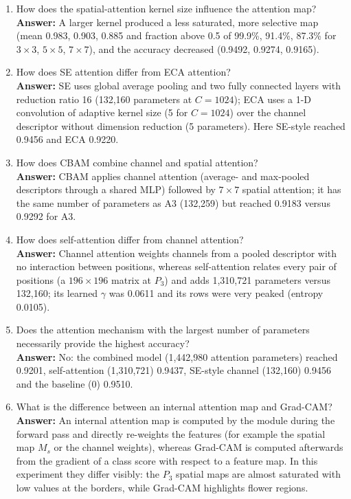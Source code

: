 \documentclass[10pt]{article}
\begin{document}
\begin{enumerate}
\item How does the spatial-attention kernel size influence the attention map?\\
\textbf{Answer:} A larger kernel produced a less saturated, more selective map (mean 0.983, 0.903, 0.885 and fraction above 0.5 of 99.9\%, 91.4\%, 87.3\% for $3\times3$, $5\times5$, $7\times7$), and the accuracy decreased (0.9492, 0.9274, 0.9165).

\item How does SE attention differ from ECA attention?\\
\textbf{Answer:} SE uses global average pooling and two fully connected layers with reduction ratio 16 (132{,}160 parameters at $C=1024$); ECA uses a 1-D convolution of adaptive kernel size (5 for $C=1024$) over the channel descriptor without dimension reduction (5 parameters). Here SE-style reached 0.9456 and ECA 0.9220.

\item How does CBAM combine channel and spatial attention?\\
\textbf{Answer:} CBAM applies channel attention (average- and max-pooled descriptors through a shared MLP) followed by $7\times7$ spatial attention; it has the same number of parameters as A3 (132{,}259) but reached 0.9183 versus 0.9292 for A3.

\item How does self-attention differ from channel attention?\\
\textbf{Answer:} Channel attention weights channels from a pooled descriptor with no interaction between positions, whereas self-attention relates every pair of positions (a $196\times196$ matrix at $P_3$) and adds 1{,}310{,}721 parameters versus 132{,}160; its learned $\gamma$ was 0.0611 and its rows were very peaked (entropy 0.0105).

\item Does the attention mechanism with the largest number of parameters
necessarily provide the highest accuracy?\\
\textbf{Answer:} No: the combined model (1{,}442{,}980 attention parameters) reached 0.9201, self-attention (1{,}310{,}721) 0.9437, SE-style channel (132{,}160) 0.9456 and the baseline (0) 0.9510.

\item What is the difference between an internal attention map and Grad-CAM?\\
\textbf{Answer:} An internal attention map is computed by the module during the forward pass and directly re-weights the features (for example the spatial map $M_s$ or the channel weights), whereas Grad-CAM is computed afterwards from the gradient of a class score with respect to a feature map. In this experiment they differ visibly: the $P_3$ spatial maps are almost saturated with low values at the borders, while Grad-CAM highlights flower regions.


\end{enumerate}
\end{document}
